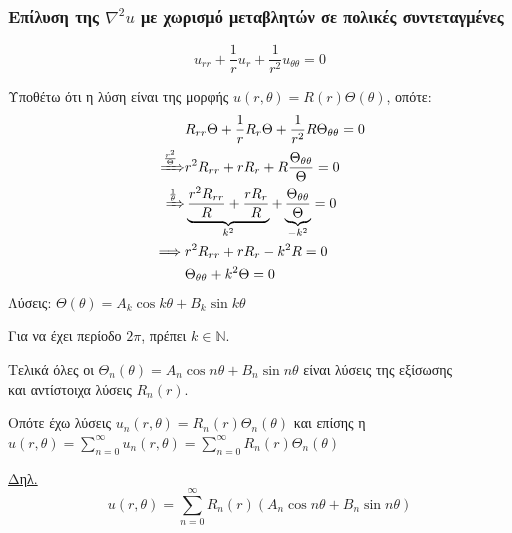 \documentclass[12pt,a4paper,notitlepage,fleqn]{article}
\begin{document}
    \subsubsection[Επίλυση της εξ. Laplace με χωρισμό μεταβλητών %
    σε πολικές συντεταγμένες]{%
    	Επίλυση της \( \nabla^2 u \) με χωρισμό μεταβλητών σε πολικές συντεταγμένες}
    
    \[
    u_{rr} + \frac{1}{r} u_r + \frac{1}{r^2}u_{\theta\theta} = 0
    \]
    
    Υποθέτω ότι η λύση είναι της μορφής \( u(r,\theta) = R(r)\Theta(\theta) \), οπότε:
    \begin{align*}
    & R_{rr}\Theta + \frac{1}{r}R_r\Theta+\frac{1}{r^2}R\Theta_{\theta\theta} = 0
    \\ \xRightarrow{\frac{r^2}{\Theta}} & r^2R_{rr} + rR_r +
     R\frac{\Theta_{\theta\theta}}{\Theta} = 0
    \\ \xRightarrow{\frac{1}{\theta}} &
    \underbrace{\frac{r^2R_{rr}}{R} + \frac{rR_r}{R}}_{k^2}
    + \underbrace{\frac{\Theta_{\theta\theta}}{\Theta}}_{-k^2} = 0
    \\ \implies & r^2R_{rr} + rR_r -k^2R = 0 \\
    & \Theta_{\theta\theta} + k^2\Theta = 0
    \end{align*}
    Λύσεις: \( \Theta(\theta) = A_k\cos k\theta + B_k \sin k\theta \)
    
    Για να έχει περίοδο \( 2\pi \), πρέπει \( k \in \mathbb N \).
    
    Τελικά όλες οι \( \Theta_n(\theta) = A_n\cos n\theta+B_n\sin n\theta \) είναι λύσεις
    της εξίσωσης \\
    και αντίστοιχα λύσεις \( R_n(r) \).
    
    Οπότε έχω λύσεις \( u_n(r,\theta) = R_n(r)\Theta_n(\theta) \)
    και επίσης η \( u(r,\theta) = \sum_{n=0}^\infty u_n(r,\theta)
    = \sum_{n=0}^{\infty} R_n(r) \Theta_n(\theta)
     \)
    
    \underline{Δηλ.}
    \[
    \boxed{
    	u(r,\theta) = \sum_{n=0}^{\infty} R_n(r)
    	\left(
    	A_n\cos n\theta + B_n\sin n\theta
    	\right) 
    	}
    \]
\end{document}

